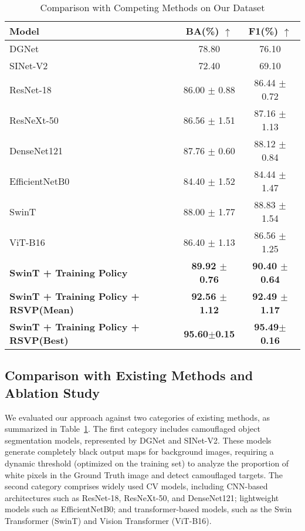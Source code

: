 \documentclass[preprint,12pt,authoryear]{elsarticle}
\begin{document}
\begin{table}[ht]
\centering
\footnotesize  %
\caption{Comparison with Competing Methods on Our Dataset}  %
\label{2}
\begin{tabular}{lcc}
\toprule
\textbf{Model} & \textbf{BA(\%)} $\uparrow$ & \textbf{F1(\%)} $\uparrow$ \\
\midrule
DGNet \cite{ji2023gradient}& 78.80 & 76.10 \\
SINet-V2 \cite{fan2021concealed}& 72.40 & 69.10 \\
ResNet-18 \cite{he2016deep}& 86.00 $\pm$ 0.88 & 86.44 $\pm$ 0.72 \\
ResNeXt-50 \cite{xie2017aggregated}& 86.56 $\pm$ 1.51 & 87.16 $\pm$ 1.13 \\
DenseNet121 \cite{huang2017densely}& 87.76 $\pm$ 0.60 & 88.12 $\pm$ 0.84 \\
EfficientNetB0 \cite{tan2019efficientnet}& 84.40 $\pm$ 1.52 & 84.44 $\pm$ 1.47 \\
SwinT \cite{Liu_2021_ICCV}& 88.00 $\pm$ 1.77 & 88.83 $\pm$ 1.54 \\
ViT-B16 \cite{dosovitskiy2020image}& 86.40 $\pm$ 1.13 & 86.56 $\pm$ 1.25 \\
\textbf{SwinT + Training Policy} & \textbf{89.92 $\pm$ 0.76} & \textbf{90.40 $\pm$ 0.64} \\
\textbf{SwinT + Training Policy + RSVP(Mean)} & \textbf{92.56 $\pm$ 1.12} & \textbf{92.49 $\pm$ 1.17} \\
\textbf{SwinT + Training Policy + RSVP(Best)} & \textbf{95.60$\pm$0.15} & \textbf{95.49$\pm$0.16}\\
\bottomrule
\end{tabular}
\end{table}

\subsection{Comparison with Existing Methods and Ablation Study}
We evaluated our approach against two categories of existing methods, as summarized in Table~\ref{2}. The first category includes camouflaged object segmentation models, represented by DGNet and SINet-V2. These models generate completely black output maps for background images, requiring a dynamic threshold (optimized on the training set) to analyze the proportion of white pixels in the Ground Truth image and detect camouflaged targets. The second category comprises widely used CV models, including CNN-based architectures such as ResNet-18, ResNeXt-50, and DenseNet121; lightweight models such as EfficientNetB0; and transformer-based models, such as the Swin Transformer (SwinT) and Vision Transformer (ViT-B16). 
\end{document}
